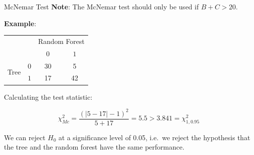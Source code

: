 \begin{frame}[c,allowframebreaks]{McNemar Test}
    \textbf{Note}: The McNemar test should only be used if $B + C > 20$.

    \framebreak

    \textbf{Example}:

    \begin{center}
      \begin{tabular}{cc|cc}
          & & \multicolumn{2}{c}{Random Forest} \\
          & & $0$ & $1$ \\
          \hline
          \multirow{2}{*}{Tree} & $0$ & 30 & 5 \\
          & $1$ & 17 & 42 \\
      \end{tabular}
    \end{center}

    Calculating the test statistic:

    $$\chi^2_{Mc} =  \frac{(|5-17| - 1)^2}{5 + 17} = 5.5 > 3.841 = \chi^2_{1,0.95}$$

    We can reject $H_0$ at a significance level of 0.05, i.e.\ we reject the hypothesis that the tree and the random forest have the same performance.
    \end{frame}


